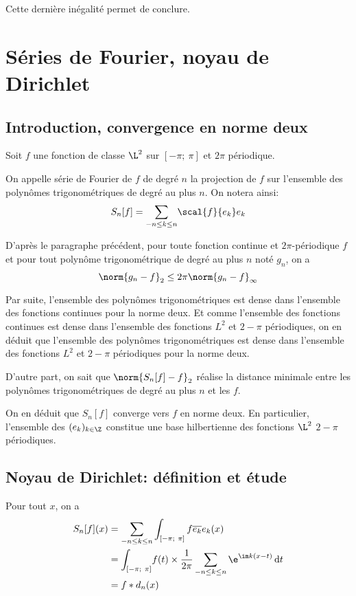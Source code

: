 Cette dernière inégalité permet de conclure.

\section{Séries de Fourier, noyau de Dirichlet}

\subsection{Introduction, convergence en norme deux}

Soit $f$ une fonction de classe $\L^2$ sur $[-\pi;~\pi]$ et $2\pi$ périodique.

On appelle série de Fourier de $f$ de degré $n$ la projection de $f$ sur l'ensemble des polynômes trigonométriques de degré au plus $n$. On notera ainsi:
\[
S_n[f] = \displaystyle{\sum \limits_{-n \leq k \leq n}} \scal{f}{e_k} e_k
\]

D'après le paragraphe précédent, pour toute fonction continue et $2\pi$-périodique $f$ et pour tout polynôme trigonométrique de degré au plus $n$ noté $g_n$, on a
\[
\norm{g_n-f}_{2} \leq 2 \pi \norm{g_n-f}_{\infty}
\]

Par suite, l'ensemble des polynômes trigonométriques est dense dans l'ensemble des fonctions continues pour la norme deux. Et comme l'ensemble des fonctions continues est dense dans l'ensemble des fonctions $L^2$ et $2-\pi$ périodiques, on en déduit que l'ensemble des polynômes trigonométriques est dense dans l'ensemble des fonctions $L^2$ et $2-\pi$ périodiques pour la norme deux. 

D'autre part, on sait que $\norm{S_n[f]-f}_{2}$ réalise la distance minimale entre les polynômes trigonométriques de degré au plus $n$ et les $f$. 

On en déduit que $S_n[f]$ converge vers $f$ en norme deux. En particulier, l'ensemble des $(e_k)_{k \in \Z}$ constitue une base hilbertienne des fonctions $\L^2$ $2-\pi$ périodiques.

\subsection{Noyau de Dirichlet: définition et étude}

Pour tout $x$, on a
\begin{align*}
S_n[f](x) & = \displaystyle{\sum \limits_{-n \leq k \leq n}} \int_{[-\pi;~\pi]} f \overline{e_k} e_k(x) \\
 & =  \displaystyle{\int_{[-\pi;~\pi]}}  f(t) \times \frac{1}{2\pi}\sum \limits_{-n \leq k \leq n} \e^{\im k(x-t)} \, \mathrm d t \\
 & = f * d_n(x)
\end{align*}

